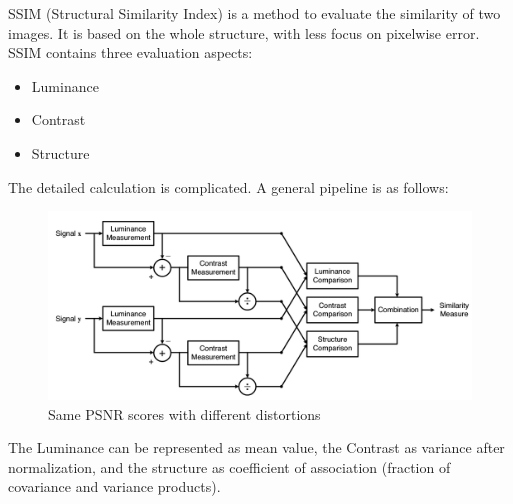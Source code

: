 \documentclass[10pt,twocolumn,letterpaper]{article}
\begin{document}
\begin{itemize}
    SSIM (Structural Similarity Index) is a method to evaluate the similarity of two images.
    It is based on the whole structure, with less focus on pixelwise error. 
    SSIM contains three evaluation aspects:
    \begin{itemize}
        \item Luminance
        \item Contrast
        \item Structure
    \end{itemize}
    The detailed calculation is complicated. A general pipeline is as follows:
    \begin{figure}[H]
        \centering
        \includegraphics[scale = 0.2]{images/SSIM.png}
        \caption{Same PSNR scores with different distortions}
    \end{figure}
    The Luminance can be represented as mean value, the Contrast as variance after normalization, 
    and the structure as coefficient of association (fraction of covariance and variance products).

\end{itemize}
\end{document}
